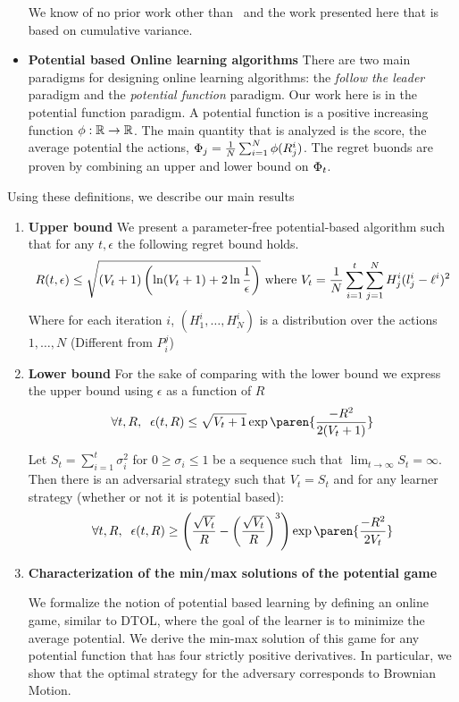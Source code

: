 \documentclass{article}[12pt]
\begin{document}
\begin{itemize}
  We know of no prior work other than~\cite{cesa2007improved} and the
  work presented here that is based on cumulative variance.
  
  \item {\bf Potential based Online learning algorithms} There are two
    main paradigms for designing online learning algorithms: the {\em
      follow the leader} paradigm and the {\em potential function}
    paradigm.  Our work here is in the potential function paradigm. A
    potential function is a positive increasing function
    $\phi:\mathbb{R} \to \mathbb{R}$. The main quantity that is analyzed is
    the score, the average potential the actions,
    $\Phi_j = \frac{1}{N} \sum_{i=1}^N \phi(R_j^i)$. The regret
    buonds are proven by combining an upper and lower bound on
    $\Phi_t$.
\end{itemize}

Using these definitions, we describe our main results
\begin{enumerate}
\item {\bf Upper bound} We present a parameter-free potential-based algorithm 
  such that for any $t,\epsilon$ the following regret bound holds. 
  \begin{equation} \label{eqn:upper-bound}
R(t,{\epsilon}) \leq \sqrt{(V_t+1) \left( \ln (V_t+1) + 2 \ln \frac{1}{\epsilon}\right)}
\mbox{  where  } V_t=\frac{1}{N} \sum_{i=1}^t \sum_{j=1}^N H^i_j (l_j^i-\ell^i)^2
\end{equation}
Where for each iteration $i$, $(H_1^i,\ldots, H_N^i)$ is a distribution
over the actions $1,\ldots,N$ (Different from $P_i^j$)

\item {\bf Lower bound}
  For the sake of comparing with the lower bound we express the upper bound using $\epsilon$ as a function of $R$
  \begin{equation}
    \forall t,R,\;\; \epsilon(t,R) \leq \sqrt{V_t+1} \exp \paren{\frac{-R^2}{2(V_t+1)}}
  \end{equation}

  Let $S_t = \sum_{i=1}^t \sigma_i^2$ for $0 \geq \sigma_i \leq 1$ be a sequence
  such that $\lim_{t \to \infty}   S_t =\infty$. Then there is an adversarial strategy such that
  $V_t=S_t$ and for any learner strategy (whether or not it is potential based):
  \begin{equation}
    \forall t,R,\;\; \epsilon(t,R) \geq
    \left(\frac{\sqrt{V_t}}{\R} -  \left( \frac{\sqrt{V_t}}{\R} \right)^3 \right) \exp \paren{\frac{-R^2}{2V_t}}
  \end{equation}
  
\item {\bf Characterization of the min/max solutions of the potential
    game}

  We formalize the notion of potential based learning by
  defining an online game, similar to DTOL, where the goal of the
  learner is to minimize the average potential. We derive the min-max
  solution of this game for any potential function that has four
  strictly positive derivatives. In particular, we show that the optimal strategy for the adversary corresponds to Brownian Motion.
\end{enumerate}
\end{document}
